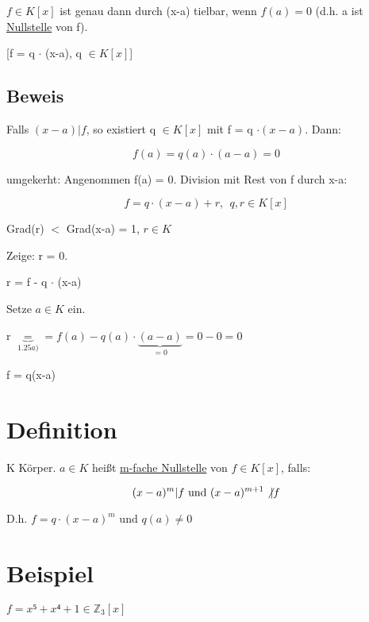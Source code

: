 \documentclass[a4paper, openany]{book}
\begin{document}
\begin{enumerate}[label=(\alph*)]
      $f \in K[x]$ ist genau dann durch (x-a) tielbar, wenn $f(a) = 0$ (d.h. a ist \underline{Nullstelle} von f).

      [f = q $\cdot$ (x-a), q $\in K[x]$]

      \subsection{Beweis}

      Falls $(x-a)|f$, so existiert q $\in K[x]$ mit f = q $\cdot (x-a)$. Dann:

      \begin{equation} 
        f(a) = q(a) \cdot (a-a) = 0
      \end{equation}

      umgekerht: Angenommen f(a) = 0. Division mit Rest von f durch x-a:

      \begin{equation}
        f = q \cdot (x-a) +r, \ \ q,r \in K[x]
      \end{equation}

      Grad(r) $<$ Grad(x-a) = 1, $r \in K$

      Zeige: r = 0.

      r = f - q $\cdot$ (x-a)

      Setze $a \in K$ ein.

      r $\underbrace{=}_{1.25a)} = f(a) - q(a) \cdot \underbrace{(a-a)}_{=0} = 0 -0 = 0$

      f = q(x-a)
    \end{enumerate}


    \section{Definition}

    K Körper. $a \in K$ heißt \underline{m-fache Nullstelle} von $f \in K[x]$, falls:

    \begin{equation}
      (x-a)^m|f \textnormal{ und } (x-a)^{m+1} \not{|} f
    \end{equation}

    D.h. $f = q \cdot (x-a)^m$ und $q(a) \neq 0$ 

    \section{Beispiel}

    $f = x⁵ + x⁴ + 1 \in \mathbb{Z}_3[x]$
\end{document}
